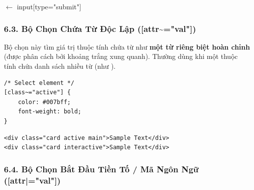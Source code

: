 \begin{browserWindow}
\sffamily\small
{} \quad
{} \textcolor{gray!60}{\scriptsize $\leftarrow$ input[type="submit"]}
\end{browserWindow}

\subsubsection{6.3. Bộ Chọn Chứa Từ Độc Lập ([attr\textasciitilde{}="val"])}

\begin{conceptBox}
Bộ chọn này tìm giá trị thuộc tính chứa từ  như \textbf{một từ riêng biệt hoàn chỉnh} (được phân cách bởi khoảng trắng xung quanh). Thường dùng khi một thuộc tính chứa danh sách nhiều từ (như ).
\end{conceptBox}

\begin{codeWindow}
\begin{lstlisting}[language=CSS3]
/* Select element */
[class~="active"] {
    color: #007bff;
    font-weight: bold;
}
\end{lstlisting}

\begin{lstlisting}[language=HTML5]
<div class="card active main">Sample Text</div>
<div class="card interactive">Sample Text</div>
\end{lstlisting}
\end{codeWindow}

\begin{browserWindow}
\sffamily\small
{} \quad
\tcbox[on line, arc=3pt, colback=gray!5, colframe=gray!30, boxsep=3pt]{\textcolor{darkText}{Không khớp (Class interactive)}}
\end{browserWindow}

\subsubsection{6.4. Bộ Chọn Bắt Đầu Tiền Tố / Mã Ngôn Ngữ ([attr|="val"])}

